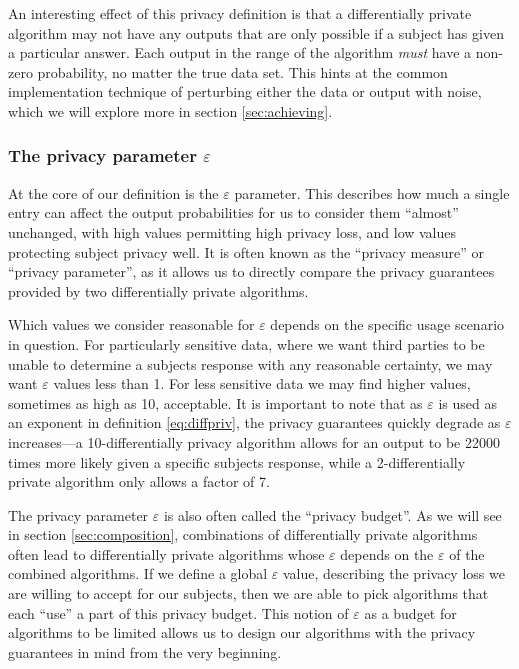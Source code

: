 \documentclass[12pt]{article}
\renewcommand{\epsilon}{\varepsilon}
\begin{document}
An interesting effect of this privacy definition is that a differentially private algorithm may not have any outputs that are only possible if a subject has given a particular answer. Each output in the range of the algorithm \emph{must} have a non-zero probability, no matter the true data set. This hints at the common implementation technique of perturbing either the data or output with noise, which we will explore more in section \ref{sec:achieving}.

\subsubsection{The privacy parameter $\epsilon$ \label{sec:epsilon}}

At the core of our definition is the $\epsilon$ parameter. This describes how much a single entry can affect the output probabilities for us to consider them ``almost'' unchanged, with high values permitting high privacy loss, and low values protecting subject privacy well. It is often known as the ``privacy measure'' or ``privacy parameter'', as it allows us to directly compare the privacy guarantees provided by two differentially private algorithms.

Which values we consider reasonable for $\epsilon$ depends on the specific usage scenario in question. For particularly sensitive data, where we want third parties to be unable to determine a subjects response with any reasonable certainty, we may want $\epsilon$ values less than 1. For less sensitive data we may find higher values, sometimes as high as 10, acceptable. It is important to note that as $\epsilon$ is used as an exponent in definition \ref{eq:diffpriv}, the privacy guarantees quickly degrade as $\epsilon$ increases---a 10-differentially privacy algorithm allows for an output to be 22000 times more likely given a specific subjects response, while a 2-differentially private algorithm only allows a factor of 7.

The privacy parameter $\epsilon$ is also often called the ``privacy budget''. As we will see in section \ref{sec:composition}, combinations of differentially private algorithms often lead to differentially private algorithms whose $\epsilon$ depends on the $\epsilon$ of the combined algorithms. If we define a global $\epsilon$ value, describing the privacy loss we are willing to accept for our subjects, then we are able to pick algorithms that each ``use'' a part of this privacy budget. This notion of $\epsilon$ as a budget for algorithms to be limited allows us to design our algorithms with the privacy guarantees in mind from the very beginning.
\end{document}
